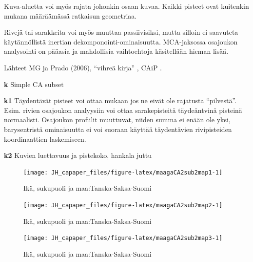 \documentclass[
  finnish,
]{book}
\begin{document}
Kuva-aluetta voi myös rajata johonkin osaan kuvaa. Kaikki pisteet ovat kuitenkin
mukana määräämässä ratkaisun geometriaa.

Rivejä tai sarakkeita voi myös muuttaa passiivisiksi, mutta silloin ei saavuteta
käytännöllistä inertian dekomponointi-ominaisuutta. MCA-jaksossa osajoukon
analysointi on pääasia ja mahdollisia vaihtoehtoja käsitellään hieman lisää.

Lähteet MG ja Prado (2006)\citep{RefWorks:doc:5a857a44e4b0ed2d44664d87},
``vihreä kirja'' \citep{RefWorks:doc:5ab76b43e4b003f4468d1f07},
CAiP \citep{RefWorks:doc:5a857a43e4b0ed2d44664d78}.

\textbf{k} Simple CA subset

\textbf{k1} Täydentävät pisteet voi ottaa mukaan jos ne eivät ole rajatusta ``pilvestä''.
Esim. rivien osajoukon analyysiin voi ottaa sarakepisteitä täydeäntvinä pisteinä
normaalisti. Osajoukon profiilit muuttuvat, niiden summa ei enään ole yksi,
barysentristä ominaisuutta ei voi suoraan käyttää täydentävien rivipisteiden
koordinaattien laskemiseen.

\textbf{k2} Kuvien luettavuus ja pistekoko, hankala juttu

\begin{figure}

{\centering \texttt{[image: JH\_capaper\_files/figure-latex/maagaCA2sub2map1-1]} 

}

\caption{Ikä, sukupuoli ja maa:Tanska-Saksa-Suomi}\label{fig:maagaCA2sub2map1}
\end{figure}

\begin{figure}

{\centering \texttt{[image: JH\_capaper\_files/figure-latex/maagaCA2sub2map2-1]} 

}

\caption{Ikä, sukupuoli ja maa:Tanska-Saksa-Suomi}\label{fig:maagaCA2sub2map2}
\end{figure}

\begin{figure}

{\centering \texttt{[image: JH\_capaper\_files/figure-latex/maagaCA2sub2map3-1]} 

}

\caption{Ikä, sukupuoli ja maa:Tanska-Saksa-Suomi}\label{fig:maagaCA2sub2map3}
\end{figure}
\end{document}
